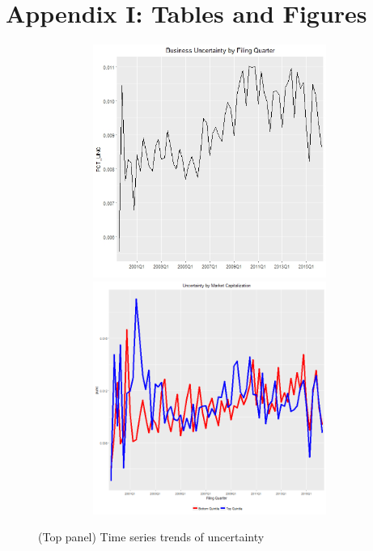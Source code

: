 \appendix 
\section*{Appendix I: Tables and Figures}
 
\newpage
 
\newpage

\newpage

\newpage

\newpage

\newpage

\newpage

\newpage
\begin{figure}[H] 
\centering
\includegraphics[width=6in, height=3in]{figures/bunc-by-quarter}
\includegraphics[width=6in, height=3in]{figures/bunc-by-mve}
\captionsetup{justification=centering, width=.95\textwidth} 
\caption{\footnotesize (Top panel) Time series trends of uncertainty} \label{bunc-figures}
\end{figure} 
\newpage
